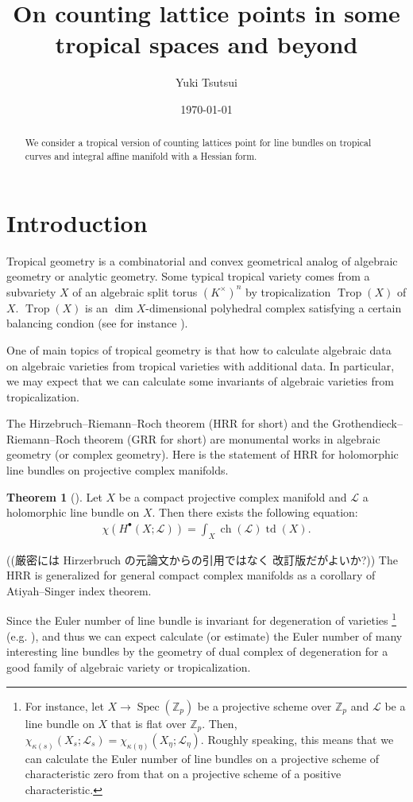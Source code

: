 \documentclass[a4paper,dvipdfmx,reqno,12pt]{amsart}
\title{On counting lattice points in some tropical spaces and beyond
}
\author[Y. Tsutsui]{Yuki Tsutsui}
\date{\today}
\theoremstyle{definition}
\newtheorem{theorem}{Theorem}[section]
\newcommand{\Z}{\mathbb{Z}}%
\newcommand{\mcal}[1]{\mathcal{#1}}%
\newcommand{\opn}[1]{\operatorname{#1}}
\newcommand{\myfootnote}[1]{\hspace{-5pt}\footnote{#1}}
\numberwithin{equation}{section}
\begin{document}
\begin{abstract}
We consider a tropical version of counting lattices point for 
line bundles on tropical curves and integral affine manifold
with a Hessian form.
\end{abstract}
\maketitle
\section{Introduction}

Tropical geometry is a combinatorial and convex 
geometrical analog of
algebraic geometry or analytic geometry.
Some typical tropical variety comes from 
a subvariety $X$ of an algebraic split torus 
$(K^{\times})^{n}$
by tropicalization $\opn{Trop}(X)$ of $X$.
$\opn{Trop}(X)$ is an $\dim X$-dimensional 
polyhedral complex satisfying a certain 
balancing condion
(see for instance 
\cite[Theorem 3.2.3]{MR3287221}).

One of main topics of tropical geometry is that 
how to calculate algebraic data on algebraic varieties
from tropical varieties with additional data. 
In particular, we may expect that we can calculate
some invariants of algebraic varieties
from tropicalization.

The Hirzebruch--Riemann--Roch theorem (HRR for short) and 
the Grothendieck--Riemann--Roch theorem (GRR for short) 
are monumental works in
algebraic geometry (or complex geometry). 
Here is the statement of HRR for holomorphic line bundles on 
projective complex manifolds.
\begin{theorem}[{\cite{MR0202713}}]
Let $X$ be a compact projective complex manifold and
$\mathcal{L}$ a holomorphic line bundle on $X$.
Then there exists the following equation:
\begin{align} \label{equation-HRR}
\chi(H^{\bullet}(X;\mathcal{L}))
=\int_X \opn{ch}(\mathcal{L})\opn{td}(X).
\end{align}
\end{theorem}

((厳密には Hirzerbruch の元論文からの引用ではなく
改訂版だがよいか?))
The HRR is generalized for 
general compact complex 
manifolds as a corollary of Atiyah--Singer index 
theorem.

Since the Euler number of line bundle is invariant for 
degeneration of varieties
\myfootnote{
For instance, let $X\to \opn{Spec}(\Z_{p})$ be a
projective scheme over $\Z_{p}$ and $\mcal{L}$
be a line bundle on $X$ that is flat over $\Z_{p}$.
Then, 
$\chi_{\kappa(s)}(X_s;\mcal{L}_s)=
\chi_{\kappa(\eta)}(X_{\eta};\mcal{L}_{\eta})$.
Roughly speaking, this means that
we can calculate the Euler number of line bundles on
a projective scheme of characteristic zero from that on a 
projective scheme of a positive characteristic.
}
(e.g. \cite[p.50]{MR2514037}), 
and thus we can expect calculate (or estimate)
the Euler number of many interesting line bundles
by the geometry of dual complex of degeneration 
for a good family of algebraic variety or 
tropicalization.
\end{document}
